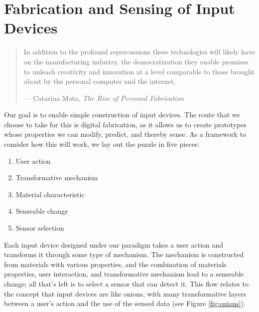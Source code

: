 \chapter{Fabrication and Sensing of Input Devices}


\begin{quote}
In addition to the profound repercussions these technologies
will likely have on the manufacturing industry, the
democratization they enable promises to unleash creativity
and innovation at a level comparable to those brought about
by the personal computer and the internet.

--- Catarina Mota, \emph{The Rise of Personal Fabrication} \cite{mota-riseof}
\end{quote}

Our goal is to enable simple construction of input devices. The route that we choose to take for this is digital fabrication, as it allows us to create prototypes whose properties we can modify, predict, and thereby sense. As a framework to consider how this will work, we lay out the puzzle in five pieces:

\begin{enumerate}
    \item User action
    \item Transformative mechanism
    \item Material characteristic
    \item Senseable change
    \item Sensor selection
\end{enumerate}

Each input device designed under our paradigm takes a user action and transforms it through some type of mechanism. The mechanism is constructed from materials with various properties, and the combination of materials properties, user interaction, and transformative mechanism lead to a senseable change; all that's left is to select a sensor that can detect it. This flow relates to the concept that input devices are like onions, with many transformative layers between a user's action and the use of the sensed data (see Figure \ref{fig:onions}).

